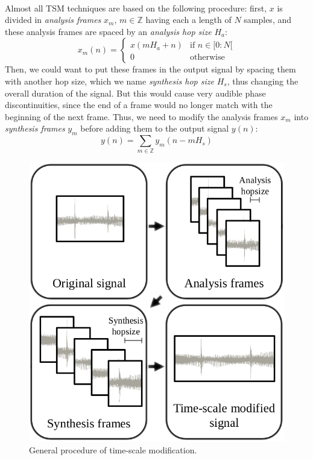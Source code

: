 \documentclass[letterpaper]{article}
\theoremstyle{definition}
\theoremstyle{remark}
\begin{document}
\paragraph{}
Almost all TSM techniques are based on the following procedure: first, \(x\)
is divided in \emph{analysis frames} \(x_m,\,m\in\mathbb{Z}\) having each a
length of \(N\) samples, and these analysis frames are spaced by an
\emph{analysis hop size} \(H_a\):
\begin{equation}x_m(n)=\begin{cases}
	x(mH_a + n) & \text{if }n\in [0:N[ \\
	0           & \text{otherwise}
\end{cases}\end{equation}
Then, we could want to put these frames in the output signal by spacing them
with another hop size, which we name \emph{synthesis hop size} \(H_s\), thus
changing the overall duration of the signal. But this would cause very audible
phase discontinuities, since the end of a frame would no longer match with the
beginning of the next frame. Thus, we need to modify the analysis frames \(x_m\)
into \emph{synthesis frames} \(y_m\) before adding them to the output signal
\(y(n)\):
\begin{equation}
	y(n) = \sum_{m\in\mathbb{Z}}y_m(n-mH_s)
\end{equation}
\begin{figure}[h]
\includegraphics[width=\linewidth]{pipeline.png}
\caption{General procedure of time-scale modification.}
\end{figure}
\end{document}
